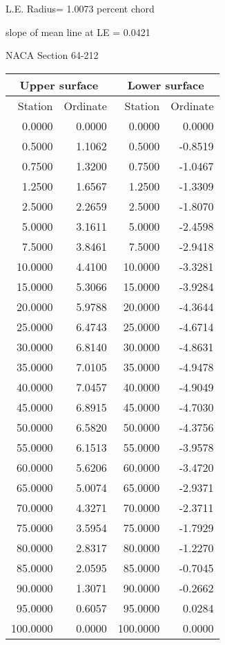 \documentclass[11pt]{book}
\begin{document}
L.E. Radius=  1.0073 percent chord


 slope of mean line at LE =  0.0421
 \newpage
  \label{s64-212}
 \begin{Large}
 NACA Section 64-212
 \end{Large}
  
 \vspace{8mm}
 \begin{tabular}{|r|r|r|r|} \hline 
 \multicolumn{2}{|c|}{Upper surface} & \multicolumn{2}{|c|}{Lower surface} \\
 \hline
 Station & Ordinate & Station & Ordinate \\
 \hline
0.0000 & 0.0000 & 0.0000 & 0.0000 \\
0.5000 & 1.1062 & 0.5000 & -0.8519 \\
0.7500 & 1.3200 & 0.7500 & -1.0467 \\
1.2500 & 1.6567 & 1.2500 & -1.3309 \\
2.5000 & 2.2659 & 2.5000 & -1.8070 \\
5.0000 & 3.1611 & 5.0000 & -2.4598 \\
7.5000 & 3.8461 & 7.5000 & -2.9418 \\
10.0000 & 4.4100 & 10.0000 & -3.3281 \\
15.0000 & 5.3066 & 15.0000 & -3.9284 \\
20.0000 & 5.9788 & 20.0000 & -4.3644 \\
25.0000 & 6.4743 & 25.0000 & -4.6714 \\
30.0000 & 6.8140 & 30.0000 & -4.8631 \\
35.0000 & 7.0105 & 35.0000 & -4.9478 \\
40.0000 & 7.0457 & 40.0000 & -4.9049 \\
45.0000 & 6.8915 & 45.0000 & -4.7030 \\
50.0000 & 6.5820 & 50.0000 & -4.3756 \\
55.0000 & 6.1513 & 55.0000 & -3.9578 \\
60.0000 & 5.6206 & 60.0000 & -3.4720 \\
65.0000 & 5.0074 & 65.0000 & -2.9371 \\
70.0000 & 4.3271 & 70.0000 & -2.3711 \\
75.0000 & 3.5954 & 75.0000 & -1.7929 \\
80.0000 & 2.8317 & 80.0000 & -1.2270 \\
85.0000 & 2.0595 & 85.0000 & -0.7045 \\
90.0000 & 1.3071 & 90.0000 & -0.2662 \\
95.0000 & 0.6057 & 95.0000 & 0.0284 \\
100.0000 & 0.0000 & 100.0000 & 0.0000 \\
 \hline 
 \end{tabular}
\end{document}
